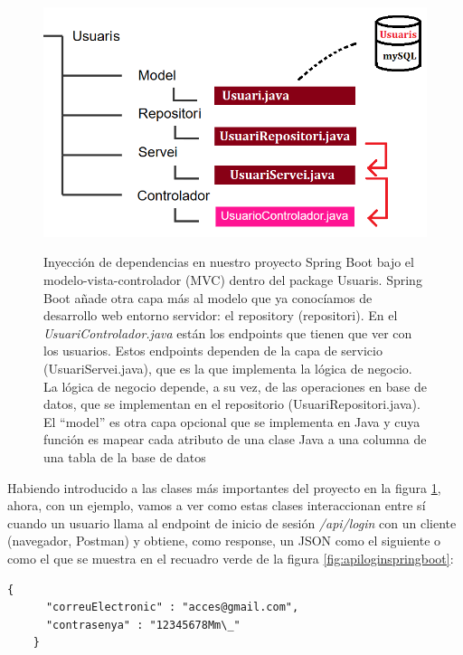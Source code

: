 \documentclass[a4paper,12pt]{report}
\begin{document}
				
							
				\FloatBarrier
				\setlength{\belowcaptionskip}{3pt}
				\begin{figure}[H]
					\centering
					\caption{Inyección de dependencias en nuestro proyecto Spring Boot bajo el modelo-vista-controlador (MVC) dentro del package Usuaris. Spring Boot añade otra capa más al modelo que ya conocíamos de desarrollo web entorno servidor: el repository (repositori). En el \textit{UsuariControlador.java} están los endpoints que tienen que ver con los usuarios. Estos endpoints dependen de la capa de servicio (UsuariServei.java), que es la que implementa la lógica de negocio. La lógica de negocio depende, a su vez, de las operaciones en base de datos, que se implementan en el repositorio (UsuariRepositori.java). El ``model'' es otra capa opcional que se implementa en Java y cuya función es mapear cada atributo de una clase Java a una columna de una tabla de la base de datos}
					\includegraphics[width=1\linewidth]{img/diagramaInjeccioDependencies}
					\label{fig:diagramaInjeccioDependencies}
				\end{figure}
				\FloatBarrier
					
				Habiendo introducido a las clases más importantes del proyecto en la figura \ref{fig:diagramaInjeccioDependencies}, ahora, con un ejemplo, vamos a ver como estas clases interaccionan entre sí cuando un usuario llama al endpoint de inicio de sesión \textit{/api/login} con un cliente (navegador, Postman) y obtiene, como response, un JSON como el siguiente o como el que se muestra en el recuadro verde de la figura \ref{fig:apiloginspringboot}:
				
			\begin{lstlisting}[language=xml, basicstyle=\ttfamily\footnotesize, keywordstyle=\color{magenta}]
	{
	  "correuElectronic" : "acces@gmail.com", 
	  "contrasenya" : "12345678Mm\_" 
	}
			\end{lstlisting}
\end{document}
